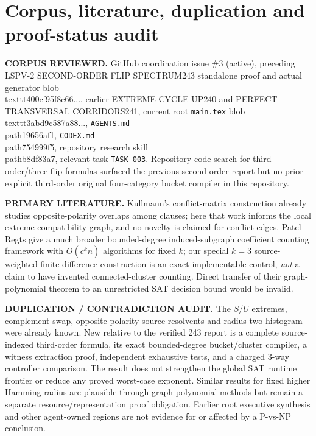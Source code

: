 \documentclass[11pt]{article}
\begin{document}
\section{Corpus, literature, duplication and proof-status audit}
\noindent\textbf{CORPUS REVIEWED.} GitHub coordination issue \#3 (active), preceding LSPV-2 SECOND-ORDER FLIP SPECTRUM243 standalone proof and actual generator blob \\texttt{400cf95f8c66...}, earlier EXTREME CYCLE UP240 and PERFECT TRANSVERSAL CORRIDORS241, current root \texttt{main.tex} blob \\texttt{3abd9c587a88...}, \texttt{AGENTS.md} \\path{19656af1}, \texttt{CODEX.md} \\path{754999f5}, repository research skill \\path{b8df83a7}, relevant task \texttt{TASK-003}. Repository code search for third-order/three-flip formulas surfaced the previous second-order report but no prior explicit third-order original four-category bucket compiler in this repository.

\noindent\textbf{PRIMARY LITERATURE.} Kullmann's conflict-matrix construction \cite{Kullmann2003} already studies opposite-polarity overlaps among clauses; here that work informs the local extreme compatibility graph, and no novelty is claimed for conflict edges. Patel--Regts \cite{PatelRegts2019} give a much broader bounded-degree induced-subgraph coefficient counting framework with $O(c^k n)$ algorithms for fixed $k$; our special $k=3$ source-weighted finite-difference construction is an exact implementable control, \emph{not} a claim to have invented connected-cluster counting. Direct transfer of their graph-polynomial theorem to an unrestricted SAT decision bound would be invalid.

\noindent\textbf{DUPLICATION / CONTRADICTION AUDIT.} The $S/U$ extremes, complement swap, opposite-polarity source resolvents and radius-two histogram were already known. New relative to the verified 243 report is a complete source-indexed third-order formula, its exact bounded-degree bucket/cluster compiler, a witness extraction proof, independent exhaustive tests, and a charged 3-way controller comparison. The result does not strengthen the global SAT runtime frontier or reduce any proved worst-case exponent. Similar results for fixed higher Hamming radius are plausible through graph-polynomial methods but remain a separate resource/representation proof obligation. Earlier root executive synthesis and other agent-owned regions are not evidence for or affected by a P-vs-NP conclusion.
\end{document}
